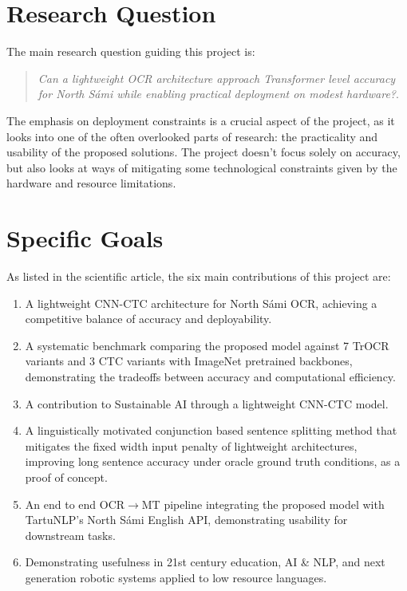 \section{Research Question}
\label{sec:research-question}
The main research question guiding this project is: 

\begin{quote}
\textit{Can a lightweight OCR architecture approach Transformer level accuracy for North S\'{a}mi while enabling practical deployment on modest hardware?}.
\end{quote}

The emphasis on deployment constraints is a crucial aspect of the project, as it looks into one of the often overlooked parts of research: the practicality and usability of the proposed solutions. The project doesn't focus solely on accuracy, but also looks at ways of mitigating some technological constraints given by the hardware and resource limitations.

\section{Specific Goals}
\label{sec:contributions}

As listed in the scientific article, the six main contributions of this project are: 


\begin{enumerate}
    \item A lightweight CNN-CTC architecture for North S\'{a}mi OCR, achieving a competitive balance of accuracy and deployability.
    \item A systematic benchmark comparing the proposed model against 7 TrOCR variants and 3 CTC variants with ImageNet pretrained backbones, demonstrating the tradeoffs between accuracy and computational efficiency.
    \item A contribution to Sustainable AI through a lightweight CNN-CTC model.
    \item A linguistically motivated conjunction based sentence splitting method that mitigates the fixed width input penalty of lightweight architectures, improving long sentence accuracy under oracle ground truth conditions, as a proof of concept.
    \item An end to end OCR$\rightarrow$MT pipeline integrating the proposed model with TartuNLP's North Sámi English API, demonstrating usability for downstream tasks.
    \item Demonstrating usefulness in 21st century education, AI \& NLP, and next generation robotic systems applied to low resource languages.
\end{enumerate}

